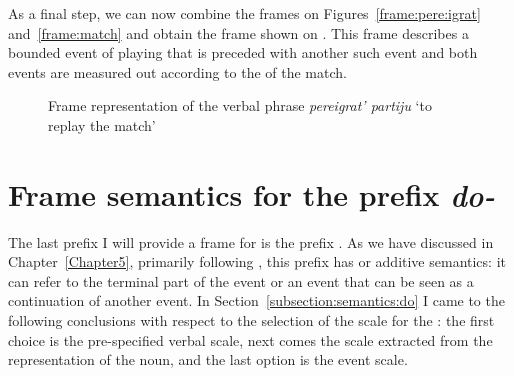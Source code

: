 As a final step, we can now combine the frames on Figures~\ref{frame:pere:igrat} and~\ref{frame:match} and obtain the frame shown on . This frame describes a bounded event of playing that is preceded with another such event and both events are measured out according to the  of the match. 

\begin{figure}\small
{}
\caption{Frame representation of the verbal phrase \textit{pereigrat' partiju} `to replay the match' \label{frame:pere:igrat:match}}
\end{figure}

\clearpage

\section{Frame semantics for the prefix \textit{do-}}\label{section:frame:do}
The last prefix I will provide a frame for is the prefix . As we have discussed in Chapter~\ref{Chapter5}, primarily following \citet{Kagan:book}, this prefix has  or additive semantics: it can refer to the terminal part of the event or an event that can be seen as a continuation of another event. In Section~\ref{subsection:semantics:do} I came to the following conclusions with respect to the selection of the scale for the : the first choice is the pre-specified verbal scale, next comes the scale extracted from the representation of the noun, and the last option is the event scale. 

